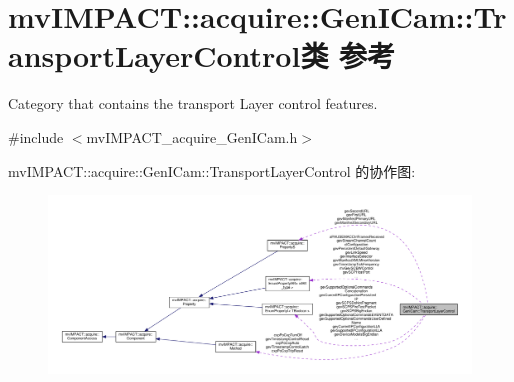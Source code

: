 \hypertarget{classmv_i_m_p_a_c_t_1_1acquire_1_1_gen_i_cam_1_1_transport_layer_control}{\section{mv\+I\+M\+P\+A\+C\+T\+:\+:acquire\+:\+:Gen\+I\+Cam\+:\+:Transport\+Layer\+Control类 参考}
\label{classmv_i_m_p_a_c_t_1_1acquire_1_1_gen_i_cam_1_1_transport_layer_control}
}


Category that contains the transport Layer control features.  




{\ttfamily \#include $<$mv\+I\+M\+P\+A\+C\+T\+\_\+acquire\+\_\+\+Gen\+I\+Cam.\+h$>$}



mv\+I\+M\+P\+A\+C\+T\+:\+:acquire\+:\+:Gen\+I\+Cam\+:\+:Transport\+Layer\+Control 的协作图\+:
\nopagebreak
\begin{figure}[H]
\begin{center}
\leavevmode
\includegraphics[width=350pt]{classmv_i_m_p_a_c_t_1_1acquire_1_1_gen_i_cam_1_1_transport_layer_control__coll__graph}
\end{center}
\end{figure}
